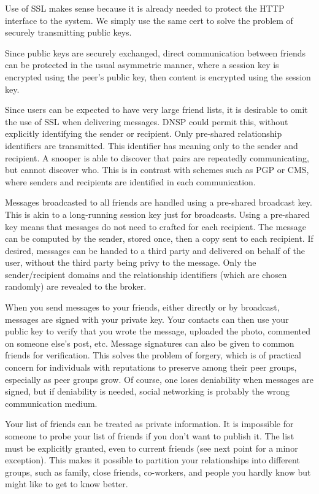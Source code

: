 \documentclass[letterpaper,11pt,oneside]{article}
\begin{document}
Use of SSL makes sense because it is already needed to protect the HTTP
interface to the system. We simply use the same cert to solve the problem of
securely transmitting public keys.

Since public keys are securely exchanged, direct communication between friends
can be protected in the usual asymmetric manner, where a session key is
encrypted using the peer's public key, then content is encrypted using the
session key.

Since users can be expected to have very large friend lists, it is desirable to
omit the use of SSL when delivering messages. DNSP could permit this, without
explicitly identifying the sender or recipient. Only pre-shared relationship
identifiers are transmitted. This identifier has meaning only to the sender and
recipient. A snooper is able to discover that pairs are repeatedly
communicating, but cannot discover who. This is in contrast with schemes such
as PGP or CMS, where senders and recipients are identified in each
communication.

Messages broadcasted to all friends are handled using a pre-shared broadcast
key. This is akin to a long-running session key just for broadcasts. Using a
pre-shared key means that messages do not need to crafted for each recipient.
The message can be computed by the sender, stored once, then a copy sent to
each recipient. If desired, messages can be handed to a third party and
delivered on behalf of the user, without the third party being privy to the
message. Only the sender/recipient domains and the relationship identifiers
(which are chosen randomly) are revealed to the broker. 

When you send messages to your friends, either directly or by broadcast,
messages are signed with your private key. Your contacts can then use your
public key to verify that you wrote the message, uploaded the photo, commented
on someone else's post, etc. Message signatures can also be given to common
friends for verification. This solves the problem of forgery, which is of
practical concern for individuals with reputations to preserve among their peer
groups, especially as peer groups grow. Of course, one loses deniability when
messages are signed, but if deniability is needed, social networking is
probably the wrong communication medium.

Your list of friends can be treated as private information. It is impossible
for someone to probe your list of friends if you don't want to publish it. The
list must be explicitly granted, even to current friends (see next point for a
minor exception). This makes it possible to partition your relationships into
different groups, such as family, close friends, co-workers, and people you
hardly know but might like to get to know better.
\end{document}
